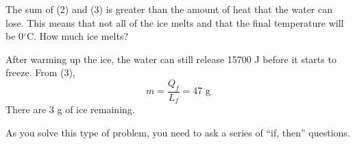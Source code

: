 The sum of (2) and (3) is greater than the amount of heat that the water can lose. This means that not all of the ice melts and that the final temperature will be 0$^\circ$C. How much ice melts?

After warming up the ice, the water can still release 15700 J before it starts to freeze. From (3),
$$m=\frac{Q_f}{L_f}=47\mbox{ g}$$
There are 3 g of ice remaining.

As you solve this type of problem, you need to ask a series of ``if, then'' questions.

\clearpage
